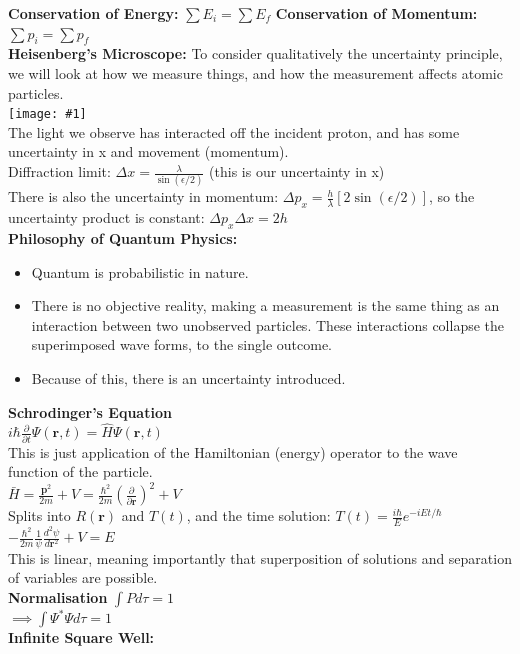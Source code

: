 \documentclass[10pt,landscape,a4paper]{article}
\newcommand{\inlineimage}[1]{\texttt{[image: \#1]}\\}
\newcommand{\tise}{\ensuremath{-\frac{\hbar^2}{2m}\frac{1}{\psi}\frac{d^2\psi}{d\textbf{r}^2} + V = E}}
\renewcommand{\^}[1]{\ensuremath{\hat{#1}}}
\renewcommand{\-}[1]{\text{\sout{\ensuremath{#1}}}}
\begin{document}
\begin{multicols}{4}
	\textbf{Conservation of Energy:} $ \sum E_i = \sum E_f $ \textbf{Conservation of Momentum:} $ \sum p_i = \sum p_f $\\
	\textbf{Heisenberg's Microscope:} To consider qualitatively the uncertainty principle, we will look at how we measure things, and how the measurement affects atomic particles.\\
	\inlineimage{hmicro.png}
	The light we observe has interacted off the incident proton, and has some uncertainty in x and movement (momentum).\\ 
	Diffraction limit: $ \Delta x = \frac{\lambda}{\sin(\epsilon/2)} $ (this is our uncertainty in x)\\
	There is also the uncertainty in momentum: $ \Delta p_x=\frac{h}{\lambda}[2\sin(\epsilon/2)] $, so the uncertainty product is constant: $ \Delta p_x \Delta x = 2h $\\
	\textbf{Philosophy of Quantum Physics:}\\
	\begin{itemize}
		\item Quantum is probabilistic in nature.
		\item There is no objective reality, making a measurement is the same thing as an interaction between two unobserved particles. These interactions collapse the superimposed wave forms, to the single outcome.
		\item Because of this, there is an uncertainty introduced. 
	\end{itemize}
	\textbf{Schrodinger's Equation}\\
	$ i\hbar \frac{\partial}{\partial t}\Psi(\textbf{r},t) = \hat{H}\Psi(\textbf{r},t) $\\
	This is just application of the Hamiltonian (energy) operator to the wave function of the particle. \\ 
	$ \bar{H} = \frac{\textbf{p}^2}{2m}+V = \frac{\hbar^2}{2m}(\frac{\partial}{\partial \textbf{r}})^2 + V $\\
	Splits into $ R(\textbf{r}) $ and $ T(t) $, and the time solution: $ T(t) = \frac{i\hbar}{E} e^{-iEt/\hbar} $\\
	\tise\\
	This is linear, meaning importantly that superposition of solutions and separation of variables are possible.\\
	\textbf{Normalisation} $ \int P d\tau = 1 $\\ $ \implies \int \Psi^*\Psi d\tau = 1 $ \\
	\textbf{Infinite Square Well:}\\

\end{multicols}
\end{document}
